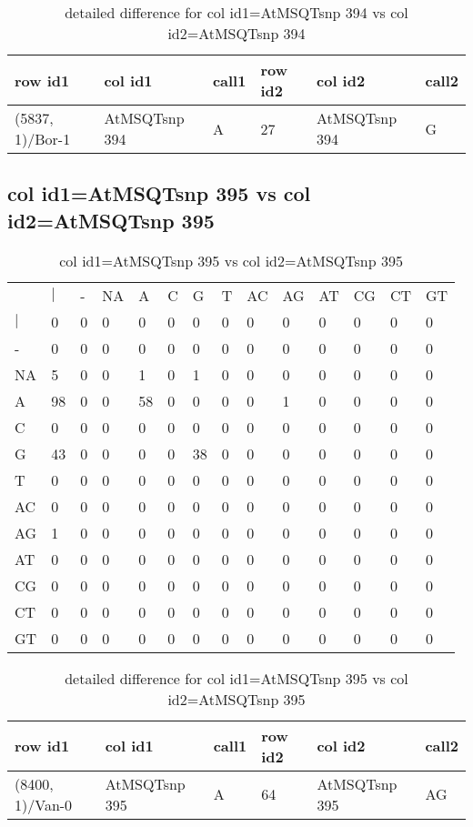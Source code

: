 \begin{center}
\begin{longtable}{|l|l|l|l|l|l|}
\caption{detailed difference for col id1=AtMSQTsnp 394 vs col id2=AtMSQTsnp 394} \label{table_dm713}\\
\hline
row id1&col id1&call1&row id2&col id2&call2\\
\hline
(5837, 1)/Bor-1&AtMSQTsnp 394&A&27&AtMSQTsnp 394&G\\
\hline
\end{longtable}
\end{center}

\subsection{col id1=AtMSQTsnp 395 vs col id2=AtMSQTsnp 395}
\begin{center}
\begin{longtable}{|l|l|l|l|l|l|l|l|l|l|l|l|l|l|}
\caption{col id1=AtMSQTsnp 395 vs col id2=AtMSQTsnp 395} \label{table_dm714}\\
\hline
\\
\hline
&$|$&-&NA&A&C&G&T&AC&AG&AT&CG&CT&GT\\
$|$&0&0&0&0&0&0&0&0&0&0&0&0&0\\
-&0&0&0&0&0&0&0&0&0&0&0&0&0\\
NA&5&0&0&1&0&1&0&0&0&0&0&0&0\\
A&98&0&0&58&0&0&0&0&1&0&0&0&0\\
C&0&0&0&0&0&0&0&0&0&0&0&0&0\\
G&43&0&0&0&0&38&0&0&0&0&0&0&0\\
T&0&0&0&0&0&0&0&0&0&0&0&0&0\\
AC&0&0&0&0&0&0&0&0&0&0&0&0&0\\
AG&1&0&0&0&0&0&0&0&0&0&0&0&0\\
AT&0&0&0&0&0&0&0&0&0&0&0&0&0\\
CG&0&0&0&0&0&0&0&0&0&0&0&0&0\\
CT&0&0&0&0&0&0&0&0&0&0&0&0&0\\
GT&0&0&0&0&0&0&0&0&0&0&0&0&0\\
\hline
\end{longtable}
\end{center}

\begin{center}
\begin{longtable}{|l|l|l|l|l|l|}
\caption{detailed difference for col id1=AtMSQTsnp 395 vs col id2=AtMSQTsnp 395} \label{table_dm715}\\
\hline
row id1&col id1&call1&row id2&col id2&call2\\
\hline
(8400, 1)/Van-0&AtMSQTsnp 395&A&64&AtMSQTsnp 395&AG\\
\hline
\end{longtable}
\end{center}

